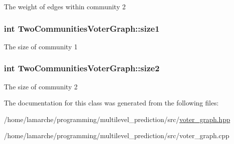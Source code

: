 The weight of edges within community 2 \hypertarget{class_two_communities_voter_graph_a3c9db0ac7e58d875ab3ce277bf74b284}{
\subsubsection[{size1}]{\setlength{\rightskip}{0pt plus 5cm}int Two\-Communities\-Voter\-Graph\-::size1}}\label{class_two_communities_voter_graph_a3c9db0ac7e58d875ab3ce277bf74b284}
The size of community 1 \hypertarget{class_two_communities_voter_graph_a8b88457f020773b984e0d8c85d9ee502}{
\subsubsection[{size2}]{\setlength{\rightskip}{0pt plus 5cm}int Two\-Communities\-Voter\-Graph\-::size2}}\label{class_two_communities_voter_graph_a8b88457f020773b984e0d8c85d9ee502}
The size of community 2 

The documentation for this class was generated from the following files\-:\begin{DoxyCompactItemize}
\item 
/home/lamarche/programming/multilevel\-\_\-prediction/src/\hyperlink{voter__graph_8hpp}{voter\-\_\-graph.\-hpp}\item 
/home/lamarche/programming/multilevel\-\_\-prediction/src/voter\-\_\-graph.\-cpp\end{DoxyCompactItemize}

